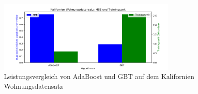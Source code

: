 \begin{figure}[ht]
    \centering
    \includegraphics[width=0.8\textwidth]{Images/housing_performance.png}
    \caption{Leistungsvergleich von AdaBoost und GBT auf dem Kalifornien Wohnungsdatensatz}
    \label{fig:housing_performance}
\end{figure}
